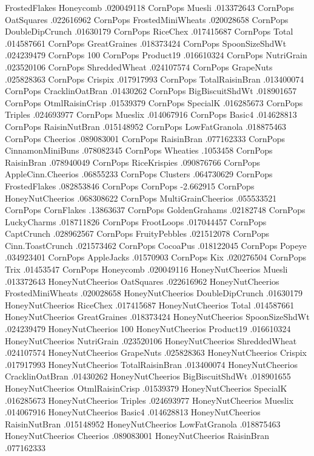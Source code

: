 FrostedFlakes	Honeycomb	.020049118
CornPops	Muesli	.013372643
CornPops	OatSquares	.022616962
CornPops	FrostedMiniWheats	.020028658
CornPops	DoubleDipCrunch	.01630179
CornPops	RiceChex	.017415687
CornPops	Total	.014587661
CornPops	GreatGraines	.018373424
CornPops	SpoonSizeShdWt	.024239479
CornPops	100%
CornPops	Product19	.016610324
CornPops	NutriGrain	.023520106
CornPops	ShreddedWheat	.024107574
CornPops	GrapeNuts	.025828363
CornPops	Crispix	.017917993
CornPops	TotalRaisinBran	.013400074
CornPops	CracklinOatBran	.01430262
CornPops	BigBiscuitShdWt	.018901657
CornPops	OtmlRaisinCrisp	.01539379
CornPops	SpecialK	.016285673
CornPops	Triples	.024693977
CornPops	Mueslix	.014067916
CornPops	Basic4	.014628813
CornPops	RaisinNutBran	.015148952
CornPops	LowFatGranola	.018875463
CornPops	Cheerios	.089083001
CornPops	RaisinBran	.077162333
CornPops	CinnamonMiniBuns	.078082345
CornPops	Wheaties	.1053458
CornPops	RaisinBran	.078940049
CornPops	RiceKrispies	.090876766
CornPops	AppleCinn.Cheerios	.06855233
CornPops	Clusters	.064730629
CornPops	FrostedFlakes	.082853846
CornPops	CornPops	-2.662915
CornPops	HoneyNutCheerios	.068308622
CornPops	MultiGrainCheerios	.055533521
CornPops	CornFlakes	.13863637
CornPops	GoldenGrahams	.02182748
CornPops	LuckyCharms	.018711826
CornPops	FrootLoops	.017044457
CornPops	CaptCrunch	.028962567
CornPops	FruityPebbles	.021512078
CornPops	Cinn.ToastCrunch	.021573462
CornPops	CocoaPus	.018122045
CornPops	Popeye	.034923401
CornPops	AppleJacks	.01570903
CornPops	Kix	.020276504
CornPops	Trix	.01453547
CornPops	Honeycomb	.020049116
HoneyNutCheerios	Muesli	.013372643
HoneyNutCheerios	OatSquares	.022616962
HoneyNutCheerios	FrostedMiniWheats	.020028658
HoneyNutCheerios	DoubleDipCrunch	.01630179
HoneyNutCheerios	RiceChex	.017415687
HoneyNutCheerios	Total	.014587661
HoneyNutCheerios	GreatGraines	.018373424
HoneyNutCheerios	SpoonSizeShdWt	.024239479
HoneyNutCheerios	100%
HoneyNutCheerios	Product19	.016610324
HoneyNutCheerios	NutriGrain	.023520106
HoneyNutCheerios	ShreddedWheat	.024107574
HoneyNutCheerios	GrapeNuts	.025828363
HoneyNutCheerios	Crispix	.017917993
HoneyNutCheerios	TotalRaisinBran	.013400074
HoneyNutCheerios	CracklinOatBran	.01430262
HoneyNutCheerios	BigBiscuitShdWt	.018901655
HoneyNutCheerios	OtmlRaisinCrisp	.01539379
HoneyNutCheerios	SpecialK	.016285673
HoneyNutCheerios	Triples	.024693977
HoneyNutCheerios	Mueslix	.014067916
HoneyNutCheerios	Basic4	.014628813
HoneyNutCheerios	RaisinNutBran	.015148952
HoneyNutCheerios	LowFatGranola	.018875463
HoneyNutCheerios	Cheerios	.089083001
HoneyNutCheerios	RaisinBran	.077162333
